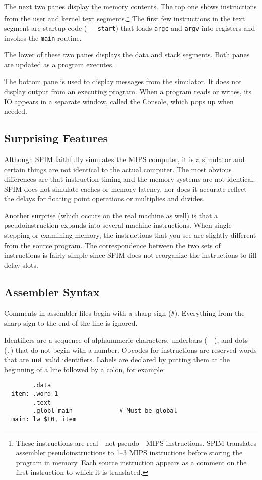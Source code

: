 \documentclass[11pt]{article}
\begin{document}
The next two panes display the memory contents.  The top one shows
instructions from the user and kernel text segments.\footnote{These
instructions are real---not pseudo---MIPS instructions.  SPIM
translates assembler pseudoinstructions to 1--3 MIPS instructions
before storing the program in memory.  Each source instruction appears
as a comment on the first instruction to which it is translated.} The
first few instructions in the text segment are startup code ({\tt
\_\_start}) that loads {\tt argc} and {\tt argv} into registers and
invokes the {\tt main} routine.

The lower of these two panes displays the data and stack segments.
Both panes are updated as a program executes.

The bottom pane is used to display messages from the simulator.  It
does not display output from an executing program.  When a program
reads or writes, its IO appears in a separate window, called the
Console, which pops up when needed.

\subsection{Surprising Features}

Although SPIM faithfully simulates the MIPS computer, it is a
simulator and certain things are not identical to the actual computer.
The most obvious differences are that instruction timing and the
memory systems are not identical.  SPIM does not simulate caches or
memory latency, nor does it accurate reflect the delays for floating
point operations or multiplies and divides.

Another surprise (which occurs on the real machine as well) is that a
pseudoinstruction expands into several machine instructions.  When
single-stepping or examining memory, the instructions that you see are
slightly different from the source program.  The correspondence
between the two sets of instructions is fairly simple since SPIM does
not reorganize the instructions to fill delay slots.

\subsection{Assembler Syntax}
\label{sec:syntax}

Comments in assembler files begin with a sharp-sign ({\tt \#}).
Everything from the sharp-sign to the end of the line is ignored.

Identifiers are a sequence of alphanumeric characters, underbars ({\tt
\_}), and dots ({\tt .}) that do not begin with a number.  Opcodes for
instructions are reserved words that are {\bf not} valid identifiers.
Labels are declared by putting them at the beginning of a line
followed by a colon, for example:
\begin{verbatim}
        .data
  item: .word 1
        .text
        .globl main             # Must be global
  main: lw $t0, item
\end{verbatim}
\end{document}

